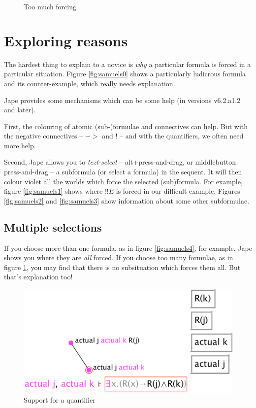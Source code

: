 \documentclass[11pt]{article}
\begin{document}
\begin{figure}
{\caption{Too much forcing}
\label{fig:samuels5}
}
\end{figure}

\section{Exploring reasons}

The hardest thing to explain to a novice is \emph{why} a particular formula is forced in a particular situation. Figure \ref{fig:samuels0} shows a particularly ludicrous formula and its counter-example, which really needs explanation.

Jape provides some mechanisms which can be some help (in versions v6.2.a1.2 and later).

First, the colouring of atomic (sub-)formulae and connectives can help. But with the negative connectives -- $->$ and $!$ -- and with the quantifiers, we often need more help.

Second, Jape allows you to \emph{text-select} -- alt+press-and-drag, or middlebutton press-and-drag -- a subformula (or select a formula) in the sequent. It will then colour violet all the worlds which force the selected (sub)formula. For example, figure \ref{fig:samuels1} shows where $!!E$ is forced in our difficult example. Figures \ref{fig:samuels2} and \ref{fig:samuels3} show information about some other subformulae.

\subsection{Multiple selections}

If you choose more than one formula, as in figure \ref{fig:samuels4}, for example, Jape shows you where they are \emph{all} forced. If you choose too many formulae, as in figure \ref{fig:samuels5}, you may find that there is no subsituation which forces them all. But that's explanation too!

\begin{figure}
\centering
\includegraphics[scale=0.6]{pics/quantifiers1}
\caption{Support for a quantifier}
\label{fig:quantifiers1}
\end{figure}
\end{document}
